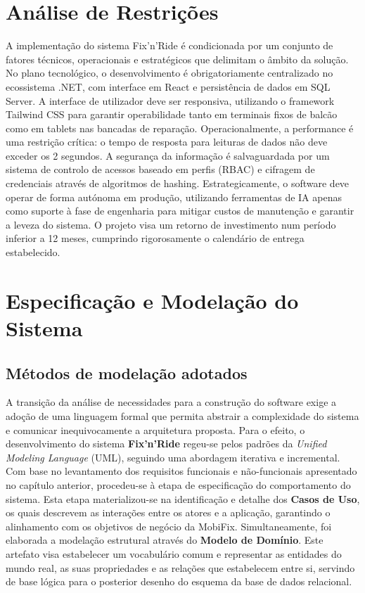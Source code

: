 \documentclass[a4paper,12pt]{scrreprt}
\begin{document}
\section{Análise de Restrições}
A implementação do sistema Fix'n'Ride é condicionada por um conjunto de fatores técnicos, operacionais e estratégicos que delimitam o âmbito da solução. No plano tecnológico, o desenvolvimento é obrigatoriamente centralizado no ecossistema .NET, com interface em React e persistência de dados em SQL Server. A interface de utilizador deve ser responsiva, utilizando o framework Tailwind CSS para garantir operabilidade tanto em terminais fixos de balcão como em tablets nas bancadas de reparação. Operacionalmente, a performance é uma restrição crítica: o tempo de resposta para leituras de dados não deve exceder os 2 segundos. A segurança da informação é salvaguardada por um sistema de controlo de acessos baseado em perfis (RBAC) e cifragem de credenciais através de algoritmos de hashing. Estrategicamente, o software deve operar de forma autónoma em produção, utilizando ferramentas de IA apenas como suporte à fase de engenharia para mitigar custos de manutenção e garantir a leveza do sistema. O projeto visa um retorno de investimento num período inferior a 12 meses, cumprindo rigorosamente o calendário de entrega estabelecido. 

\section{Especificação e Modelação do Sistema}

\subsection{Métodos de modelação adotados}
    A transição da análise de necessidades para a construção do software exige a adoção de uma linguagem formal que permita abstrair a complexidade do sistema e comunicar inequivocamente a arquitetura proposta. Para o efeito, o desenvolvimento do sistema \textbf{Fix'n'Ride} regeu-se pelos padrões da \textit{Unified Modeling Language} (UML), seguindo uma abordagem iterativa e incremental. Com base no levantamento dos requisitos funcionais e não-funcionais apresentado no capítulo anterior, procedeu-se à etapa de especificação do comportamento do sistema. Esta etapa materializou-se na identificação e detalhe dos \textbf{Casos de Uso}, os quais descrevem as interações entre os atores e a aplicação, garantindo o alinhamento com os objetivos de negócio da MobiFix. Simultaneamente, foi elaborada a modelação estrutural através do \textbf{Modelo de Domínio}. Este artefato visa estabelecer um vocabulário comum e representar as entidades do mundo real, as suas propriedades e as relações que estabelecem entre si, servindo de base lógica para o posterior desenho do esquema da base de dados relacional. 
\end{document}
